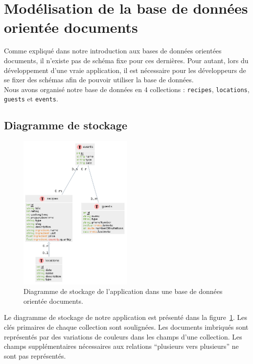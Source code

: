 \section{Modélisation de la base de données orientée documents}%
\label{sec:modelisation}

	Comme expliqué dans notre introduction aux bases de données orientées documents, il n'existe pas de schéma fixe pour ces dernières. Pour autant, lors du développement d'une vraie application, il est nécessaire pour les développeurs de se fixer des schémas afin de pouvoir utiliser la base de données.\\

	Nous avons organisé notre base de données en 4 collections : \verb|recipes|, \verb|locations|, \verb|guests| et \verb|events|.

	\subsection{Diagramme de stockage}

		\begin{figure}[H]
			\centering
			\includegraphics[width=0.5\textwidth]{images/diagramme-stockage.png}
			\caption{Diagramme de stockage de l'application dans une base de données orientée documents.}
			\label{fig:diagramme-stockage}
		\end{figure}

		Le diagramme de stockage de notre application est présenté dans la figure~\ref{fig:diagramme-stockage}. Les clés primaires de chaque collection sont soulignées. Les documents imbriqués sont représentés par des variations de couleurs dans les champs d'une collection. Les champs supplémentaires nécessaires aux relations \enquote{plusieurs vers plusieurs} ne sont pas représentés.

